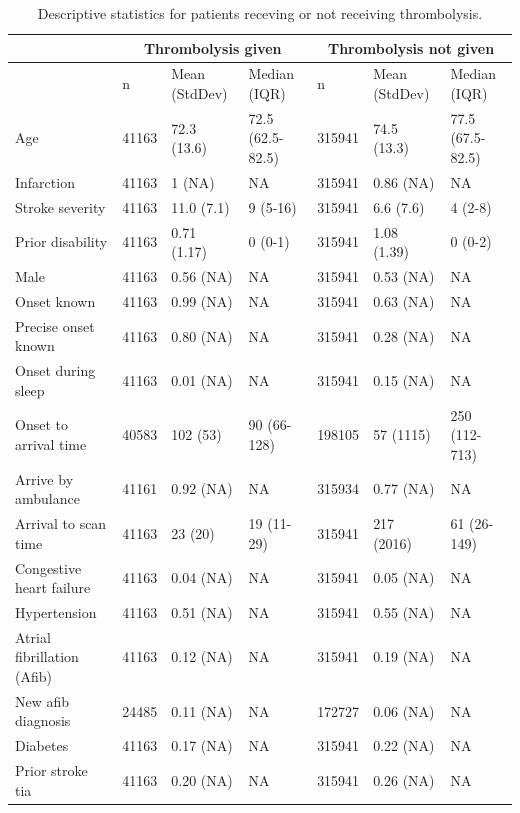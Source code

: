 \begin{minipage}{1\textwidth}
\small
\begin{longtable}[]{@{}l | lll | lll @{}}
\caption{Descriptive statistics for patients receving or not receiving thrombolysis.}\\
\toprule\noalign{}
& \multicolumn{3}{c|}{Thrombolysis given} & \multicolumn{3}{c}{Thrombolysis not given} \\ 
\endhead
\bottomrule\noalign{}
\endlastfoot

& n & Mean (StdDev) & Median (IQR) & n & Mean (StdDev) & Median (IQR) \\
\midrule\noalign{}
Age & 41163 & 72.3 (13.6) & 72.5 (62.5-82.5) & 315941 & 74.5 (13.3) & 77.5 (67.5-82.5) \\
Infarction & 41163 & 1 (NA) & NA & 315941 & 0.86 (NA) & NA \\
Stroke severity & 41163 & 11.0 (7.1) & 9 (5-16) & 315941 & 6.6 (7.6) & 4 (2-8) \\
Prior disability & 41163 & 0.71 (1.17) & 0 (0-1) & 315941 & 1.08 (1.39) & 0 (0-2) \\
Male & 41163 & 0.56 (NA) & NA & 315941 & 0.53 (NA) & NA \\
Onset known & 41163 & 0.99 (NA) & NA & 315941 & 0.63 (NA) & NA \\
Precise onset known & 41163 & 0.80 (NA) & NA & 315941 & 0.28 (NA) & NA \\
Onset during sleep & 41163 & 0.01 (NA) & NA & 315941 & 0.15 (NA) & NA \\
Onset to arrival time & 40583 & 102 (53) & 90 (66-128) & 198105 & 57 (1115) & 250 (112-713) \\
Arrive by ambulance & 41161 & 0.92 (NA) & NA & 315934 & 0.77 (NA) & NA \\
Arrival to scan time & 41163 & 23 (20) & 19 (11-29) & 315941 & 217 (2016) & 61 (26-149) \\
Congestive heart failure & 41163 & 0.04 (NA) & NA & 315941 & 0.05 (NA) & NA \\
Hypertension & 41163 & 0.51 (NA) & NA & 315941 & 0.55 (NA) & NA \\
Atrial fibrillation (Afib) & 41163 & 0.12 (NA) & NA & 315941 & 0.19 (NA) & NA \\
New afib diagnosis & 24485 & 0.11 (NA) & NA & 172727 & 0.06 (NA) & NA \\
Diabetes & 41163 & 0.17 (NA) & NA & 315941 & 0.22 (NA) & NA \\
Prior stroke tia & 41163 & 0.20 (NA) & NA & 315941 & 0.26 (NA) & NA \\

\end{longtable}
\end{minipage}
